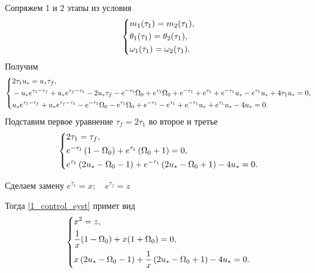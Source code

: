 \documentclass[a4paper,12pt, openany]{book}
\theoremstyle{plain} %
\theoremstyle{definition} %
\theoremstyle{remark} %
\numberwithin{equation}{chapter}
\begin{document}
{Сопряжем 1 и 2 этапы из условия
\[
    \left\{ {\begin{aligned}
                 & m_1(\tau_1) = m_2(\tau_1), \hfill            \\
                 & \theta_1(\tau_1) =  \theta_2(\tau_1), \hfill \\
                 & \omega_1(\tau_1) = \omega_2(\tau_1) . \hfill \\
            \end{aligned}} \right.
\]
Получим
\[
    \left\{ {\begin{aligned}
                 & 2 \tau _1 u_*=u_* \tau _f, \hfill            \\
                 & -u_* e^{\tau _1-\tau _f}+u_* e^{\tau _f-\tau _1}-2 u_* \tau _f-e^{-\tau _1} \Omega _0+e^{\tau _1} \Omega _0+e^{-\tau _1}+e^{\tau _1}+e^{-\tau _1} u_*-e^{\tau _1} u_*+4 \tau _1 u_*=0, \hfill \\
                 & u_* e^{\tau _1-\tau _f}+u_* e^{\tau _f-\tau _1}-e^{-\tau _1} \Omega _0-e^{\tau _1} \Omega _0+e^{-\tau _1}-e^{\tau _1}+e^{-\tau _1} u_*+e^{\tau _1} u_*-4 u_*=0. \hfill \\
            \end{aligned}} \right.
\]
Подставим первое уравнение $\tau_f=2\tau_1$ во второе и третье
\begin{equation}\label{1_control_syst}
    \left\{ {\begin{aligned}
                 & 2 \tau _1=\tau _f, \hfill            \\
                 & e^{-\tau _1} \left(1-\Omega _0\right)+e^{\tau _1} \left(\Omega _0+1\right)=0, \hfill \\
                 & e^{\tau _1} \left(2 u_*-\Omega _0-1\right)+e^{-\tau _1} \left(2 u_*-\Omega _0+1\right)-4 u_*=0. \hfill \\
            \end{aligned}} \right.
\end{equation}
            
Сделаем замену $e^{\tau_1}=x;\quad e^{\tau_f}=z$

Тогда \eqref{1_control_syst} примет вид
\begin{equation}\label{1_control_syst_subst}
    \left\{ {\begin{aligned}
                 & x^2 = z, \hfill            \\
                 & \dfrac{1}{x}(1-\Omega_0)+x(1+\Omega_0)=0, \hfill \\
                 & x \left(2 u_*-\Omega _0-1\right)+\dfrac{1}{x}\left(2 u_*-\Omega _0+1\right)-4 u_*=0. \hfill \\
            \end{aligned}} \right.
\end{equation}

}
\end{document}

